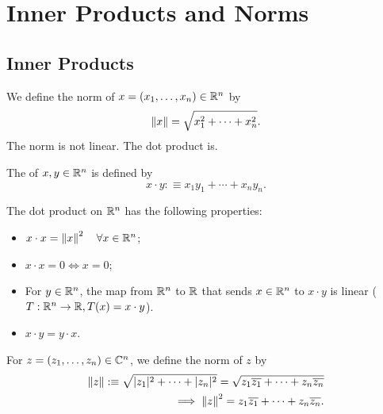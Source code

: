 \section{Inner Products and Norms}

\subsection{Inner Products}
We define the norm of $x=(x_1, \ldots, x_n) \in \mathbb{R}^n$ by
\begin{equation}
  \left \lVert x \right \rVert = \sqrt{x_1^2 + \cdots + x_n^2}.
\end{equation}
The norm is not linear. The dot product is.

\begin{mydef} 
  The  of $x,y \in \mathbb{R}^n$ is defined by
  \begin{equation}
    x \cdot y :\equiv x_1 y_1 + \cdots + x_n y_n.
  \end{equation}
\end{mydef}

The dot product on $\mathbb{R}^n$ has the following properties:
\begin{itemize}
  \item $x \cdot x = \left \lVert x \right \rVert^2 \quad \forall x \in \mathbb{R}^n$;
  \item $x \cdot x = 0 \iff x= 0$;
  \item For $y\in \mathbb{R}^n$, the map from $\mathbb{R}^n$ to $\mathbb{R}$ that sends $x \in \mathbb{R}^n$ to $x\cdot y$ is linear ($T: \mathbb{R}^n \to \mathbb{R}, T(x) = x \cdot y$).
  \item $x \cdot y = y \cdot x$.
\end{itemize}

For $z = (z_1, \ldots, z_n) \in \mathbb{C}^n$, we define the norm of $z$ by
\begin{equation}
  \begin{aligned}
    \left \lVert z \right \rVert :\equiv \sqrt{ |z_1|^2 + \cdots + |z_n|^2} = \sqrt{ z_1 \overline {z_1} + \cdots + z_n \overline {z_n}} \\
    \implies \left \lVert z \right \rVert^2 = z_1 \overline{z_1} + \cdots + z_n \overline{z_n}.
  \end{aligned}
\end{equation}

